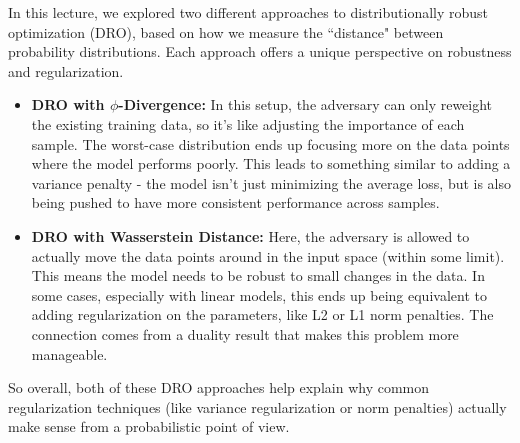\documentclass[12pt]{report}
\begin{document}
In this lecture, we explored two different approaches to distributionally robust optimization (DRO), based on how we measure the ``distance" between probability distributions. Each 
approach offers a unique perspective on robustness and regularization.
\begin{itemize}
    \item \textbf{DRO with $\phi$-Divergence:} In this setup, the adversary can only reweight the existing training data, so it's like adjusting the importance of each sample. 
    The worst-case distribution ends up focusing more on the data points where the model performs poorly. 
    This leads to something similar to adding a variance penalty - the model isn't just minimizing the average loss, but is also being pushed to have more consistent performance across samples.
    \item \textbf{DRO with Wasserstein Distance:} Here, the adversary is allowed to actually move the data points around in the input space (within some limit). 
    This means the model needs to be robust to small changes in the data. In some cases, especially with linear models, 
    this ends up being equivalent to adding regularization on the parameters, like L2 or L1 norm penalties. 
    The connection comes from a duality result that makes this problem more manageable.
\end{itemize}
So overall, both of these DRO approaches help explain why common regularization techniques (like variance regularization or norm penalties) actually make sense from a probabilistic point of view.


\newpage
\end{document}
